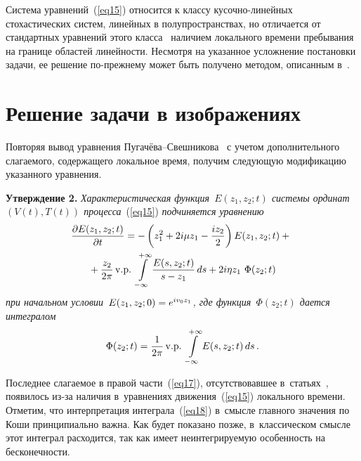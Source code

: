 \begin{multicols}{2}
Система уравнений~(\ref{eq15}) относится к классу ку\-соч\-но-ли\-ней\-ных стохастических систем, линейных в полупространствах, но отличается от стандартных уравнений этого класса~\cite{ref14} наличием локального времени пребывания на границе областей линейности. Несмотря на указанное усложнение постановки задачи, ее решение по-прежнему может быть получено методом, описанным в~\cite{ref14}.

\section{Решение задачи в изображениях}

Повторяя вывод уравнения Пу\-га\-чё\-ва--Свеш\-ни\-ко\-ва~\cite{ref15} с учетом дополнительного слагаемого, содержащего локальное время, получим следующую модификацию указанного уравнения.

\smallskip

\noindent
\textbf{Утверждение 2.}
\textit{Характеристическая функция~$E(z_1, z_2;t)$ системы ординат~$(V(t), T(t))$ процесса}~(\ref{eq15}) \textit{подчиняется уравнению}
  \begin{multline}
    \label{eq17}
    \!\fr{\partial E(z_1,z_2;t)}{\partial t} = -\left( z_1^2 + 2i  \mu  z_1 - \fr{i z_2}{2}\right) E(z_1, z_2; t) +{}\\
     {}+\fr{z_2}{2 \pi}\, \mathrm{v.p.}\ \int \limits_{-\infty}^{+\infty} \fr{E(s, z_2; t)}{s-z_1}\,ds + 2i\eta z_1\ \Phi(z_2; t)
  \end{multline}
  \textit{при начальном условии~$E(z_1, z_2; 0)\hm = e^{i v_0 z_1}$, где функция~$\Phi(z_2; t)$ дается интегралом}
  \begin{equation}
    \label{eq18}
    \Phi(z_2; t) = \displaystyle\frac{\displaystyle 1\mathstrut}{\displaystyle 2 \pi\mathstrut}\, \mathrm{v.p.}\ \int \limits_{-\infty}^{+\infty} E(s, z_2; t)\, ds\,.
  \end{equation}

Последнее слагаемое в правой части~(\ref{eq17}), отсутствовавшее в~статьях~\cite{ref14,ref15,ref15a,ref17}, появилось из-за наличия в~уравнениях движения~(\ref{eq15}) локального времени. Отметим, что интерпретация интеграла~(\ref{eq18}) в~смысле главного значения по Коши принципиально важна. Как будет показано позже, в~классическом смысле этот интеграл расходится, так как имеет неинтегрируемую особенность на бесконечности.


\end{multicols}
